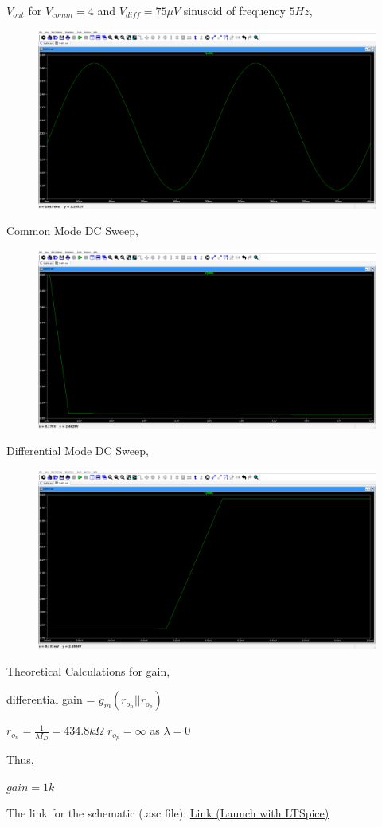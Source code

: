 \documentclass{article}
\begin{document}
$V_{out}$ for $V_{comm} = 4$ and $ V_{diff} = 75\mu V$ sinusoid of frequency $5Hz$,

\begin{figure}[H]
    \centering
    \includegraphics[width=0.75\linewidth]{SmallSignal.jpg}
\end{figure}

Common Mode DC Sweep,

\begin{figure}[H]
    \centering
    \includegraphics[width=0.75\linewidth]{CommonDC.jpg}
\end{figure}

Differential Mode DC Sweep,

\begin{figure}[H]
    \centering
    \includegraphics[width=0.75\linewidth]{DifferenceDC.jpg}
\end{figure}

Theoretical Calculations for gain,

differential gain = $g_m(r_{o_n}||r_{o_p})$


$r_{o_n} = \frac{1}{\lambda I_D} = 434.8k\Omega$
$r_{o_p} = \infty$ as $\lambda = 0$

Thus,

$gain = 1k$

The link for the schematic (.asc file):
\href{https://github.com/me-coder-1204/EDC/blob/master/4/Draft4.asc}{Link (Launch with LTSpice)}
\end{document}
